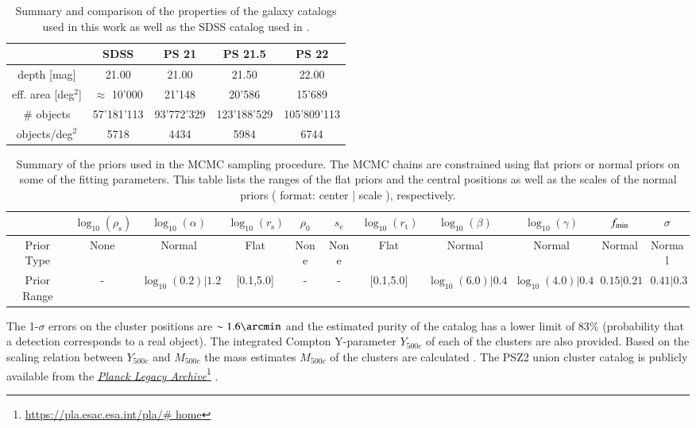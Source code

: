 \documentclass[iop, apjl, twocolappendix, numberedappendix]{emulateapj}
\newcommand\fnurl[2]{%
  \href{#2}{#1}\footnote{\url{#2}}%
}
\begin{document}
\begin{table}
    \centering
    \caption{Summary and comparison of the properties of the galaxy catalogs used in this work as well as the SDSS catalog used in \citet{more2016detection}.}
    \label{tab:galaxy_catalogs}
    \begin{tabular}{ccccc}
    \hline 
    & SDSS & PS 21 & PS 21.5 & PS 22 \\ 
    \hline 
    depth [mag] & 21.00 & 21.00 & 21.50 & 22.00\\ 
    \hline 
    eff. area [deg$^2$] & $\approx$ 10'000 & 21'148 & 20'586 & 15'689\\ 
    \hline 
    \# objects & 57'181'113 & 93'772'329 & 123'188'529 & 105'809'113 \\
    \hline
    objects/deg$^2$ & 5718 & 4434 & 5984 & 6744\\ 
    \hline
    \end{tabular} 
\end{table}
\begin{table}
    \centering
    \caption{Summary of the priors used in the MCMC sampling
procedure. The MCMC chains are constrained using flat priors or
normal priors on some of the fitting parameters. This table lists
the ranges of the flat priors and the central positions as well as
the scales of the normal priors ( format: center | scale ),
respectively.}
    \label{tab:priors}
    \begin{tabular}{ccccccccccc}
    \hline 
    & $\log_{10}(\rho_{\mathrm{s}})$ & $\log_{10}(\alpha)$ & $\log_{10}(r_{\mathrm{s}})$ & $\rho_0$ & $s_{\mathrm{e}}$ & $\log_{10}(r_{\mathrm{t}})$ & $\log_{10}(\beta)$ & $\log_{10}(\gamma)$ & $f_{\rm min}$ & $\sigma$\\ 
    \hline 
    Prior Type & None & Normal & Flat & None & None & Flat & Normal & Normal & Normal & Normal\\ 
    \hline 
    Prior Range & - & $\log_{10}(0.2)| 1.2$ & [0.1,5.0] & - & - & [0.1,5.0] & $\log_{10}(6.0) | 0.4$ & $\log_{10}(4.0) | 0.4$ & $0.15 | 0.21$ & $0.41 | 0.3$\\
    \hline
    \end{tabular} 
\end{table}

The 1-$\sigma$ errors on the cluster positions are $\sim1.6\arcmin$
and the estimated purity of the catalog has a lower limit of 83\%
(probability that a detection corresponds to a real object). The
integrated Compton Y-parameter $Y_{500c}$ of each of the clusters
are also provided. Based on the scaling relation between $Y_{500c}$
and $M_{500c}$ \citep{ade2014planck} the mass estimates $M_{500c}$
of the clusters are calculated
\citep{adam2016planck,collaboration2016planck}. The PSZ2 union
cluster catalog is publicly available from the \fnurl{\textit{Planck
Legacy Archive}}{https://pla.esac.esa.int/pla/\# home}.
\end{document}
